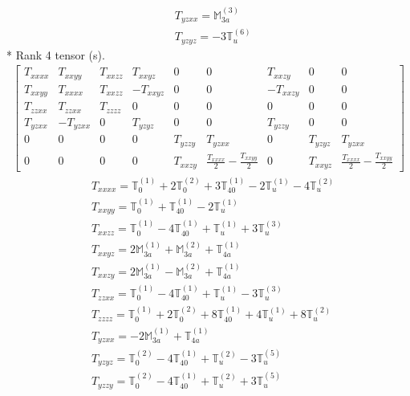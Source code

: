 \documentclass[fleqn,8pt,landscape]{jsarticle}
\begin{document}
\begin{align*}
& T_{yzxx} = \mathbb{M}_{3a}^{(3)} \\
& T_{yzyz} = - 3 \mathbb{T}_{u}^{(6)}
\end{align*}
* Rank 4 tensor (s).
\begin{align*}
\begin{bmatrix} T_{xxxx} & T_{xxyy} & T_{xxzz} & T_{xxyz} & 0 & 0 & T_{xxzy} & 0 & 0 \\ T_{xxyy} & T_{xxxx} & T_{xxzz} & - T_{xxyz} & 0 & 0 & - T_{xxzy} & 0 & 0 \\ T_{zzxx} & T_{zzxx} & T_{zzzz} & 0 & 0 & 0 & 0 & 0 & 0 \\ T_{yzxx} & - T_{yzxx} & 0 & T_{yzyz} & 0 & 0 & T_{yzzy} & 0 & 0 \\ 0 & 0 & 0 & 0 & T_{yzzy} & T_{yzxx} & 0 & T_{yzyz} & T_{yzxx} \\ 0 & 0 & 0 & 0 & T_{xxzy} & \frac{T_{xxxx}}{2} - \frac{T_{xxyy}}{2} & 0 & T_{xxyz} & \frac{T_{xxxx}}{2} - \frac{T_{xxyy}}{2} \end{bmatrix}
\end{align*}
\begin{align*}
& T_{xxxx} = \mathbb{T}_{0}^{(1)} + 2 \mathbb{T}_{0}^{(2)} + 3 \mathbb{T}_{40}^{(1)} - 2 \mathbb{T}_{u}^{(1)} - 4 \mathbb{T}_{u}^{(2)} \\
& T_{xxyy} = \mathbb{T}_{0}^{(1)} + \mathbb{T}_{40}^{(1)} - 2 \mathbb{T}_{u}^{(1)} \\
& T_{xxzz} = \mathbb{T}_{0}^{(1)} - 4 \mathbb{T}_{40}^{(1)} + \mathbb{T}_{u}^{(1)} + 3 \mathbb{T}_{u}^{(3)} \\
& T_{xxyz} = 2 \mathbb{M}_{3a}^{(1)} + \mathbb{M}_{3a}^{(2)} + \mathbb{T}_{4a}^{(1)} \\
& T_{xxzy} = 2 \mathbb{M}_{3a}^{(1)} - \mathbb{M}_{3a}^{(2)} + \mathbb{T}_{4a}^{(1)} \\
& T_{zzxx} = \mathbb{T}_{0}^{(1)} - 4 \mathbb{T}_{40}^{(1)} + \mathbb{T}_{u}^{(1)} - 3 \mathbb{T}_{u}^{(3)} \\
& T_{zzzz} = \mathbb{T}_{0}^{(1)} + 2 \mathbb{T}_{0}^{(2)} + 8 \mathbb{T}_{40}^{(1)} + 4 \mathbb{T}_{u}^{(1)} + 8 \mathbb{T}_{u}^{(2)} \\
& T_{yzxx} = - 2 \mathbb{M}_{3a}^{(1)} + \mathbb{T}_{4a}^{(1)} \\
& T_{yzyz} = \mathbb{T}_{0}^{(2)} - 4 \mathbb{T}_{40}^{(1)} + \mathbb{T}_{u}^{(2)} - 3 \mathbb{T}_{u}^{(5)} \\
& T_{yzzy} = \mathbb{T}_{0}^{(2)} - 4 \mathbb{T}_{40}^{(1)} + \mathbb{T}_{u}^{(2)} + 3 \mathbb{T}_{u}^{(5)}
\end{align*}
\end{document}
